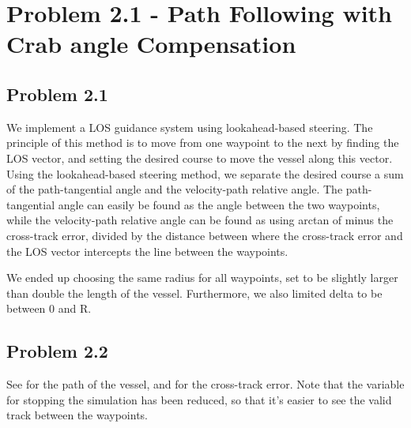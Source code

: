 \section*{Problem 2.1 - Path Following with Crab angle Compensation}
\subsection*{Problem 2.1}
We implement a LOS guidance system using lookahead-based steering. The principle of this method is to move from one waypoint to the next by finding the LOS vector, and setting the desired course to move the vessel along this vector. Using the lookahead-based steering method, we separate the desired course a sum of the path-tangential angle and the velocity-path relative angle. The path-tangential angle can easily be found as the angle between the two waypoints, while the velocity-path relative angle can be found as using arctan of minus the cross-track error, divided by the distance between where the cross-track error and the LOS vector intercepts the line between the waypoints. 

We ended up choosing the same radius for all waypoints, set to be slightly larger than double the length of the vessel. Furthermore, we also limited delta to be between 0 and R. 

\subsection*{Problem 2.2}
See  for the path of the vessel, and  for the cross-track error. Note that the variable for stopping the simulation has been reduced, so that it's easier to see the valid track between the waypoints. 

